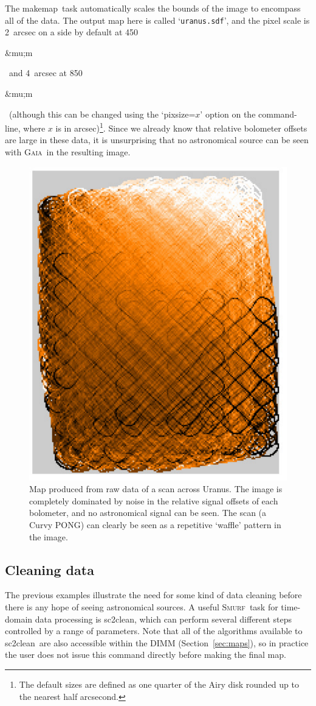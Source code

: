 \documentclass[twoside,11pt]{article}
\newcommand{\micron}{\mbox{\,${\umu}$m}}            %
\newcommand{\xref}[3]{#1}
\newcommand{\xlabel}[1]{}
\renewcommand{\_}{\texttt{\symbol{95}}}
\newcommand{\gaia}{\xref{\textsc{Gaia}}{sun214}{}}
\newcommand{\smurf}{\xref{\textsc{Smurf}}{sun258}{}}
\newcommand{\task}[1]{\textsf{#1}}
\newcommand{\clean}{\xref{\task{sc2clean}}{sun258}{SC2CLEAN}}
\newcommand{\makemap}{\xref{\task{makemap}}{sun258}{MAKEMAP}}
\renewcommand{\micron}{\begin{rawhtml}&mu;m\end{rawhtml}}
\begin{document}
The \makemap\ task automatically scales the bounds of the image to
encompass all of the data. The output map here is called
`\texttt{uranus.sdf}', and the pixel scale is 2~arcsec on a side by
default at 450\micron\ and 4~arcsec at 850\micron\ (although this can
be changed using the `pixsize=$x$' option on the command-line, where
$x$ is in arcsec)\footnote{The default sizes are defined as one
  quarter of the Airy disk rounded up to the nearest half
  arcsecond.}. Since we already know that relative bolometer offsets
are large in these data, it is unsurprising that no astronomical
source can be seen with \gaia\ in the resulting image.

\begin{figure}
\begin{center}
\includegraphics[width=0.5\linewidth]{sc19_rawmap}
\caption{Map produced from raw data of a scan across Uranus. The
  image is completely dominated by noise in the relative signal
  offsets of each bolometer, and no astronomical signal can be
  seen. The scan (a Curvy PONG) can clearly be seen as a repetitive
  `waffle' pattern in the image.}
\label{fig:rawmap}
\end{center}
\end{figure}

\subsection{\xlabel{clean}Cleaning data}

The previous examples illustrate the need for some kind of data
cleaning before there is any hope of seeing astronomical sources. A
useful \smurf\ task for time-domain data processing is \clean, which
can perform several different steps controlled by a range of
parameters. Note that all of the algorithms available to \clean\ are
also accessible within the DIMM (Section~\ref{sec:maps}), so in
practice the user does not issue this command directly before making
the final map.
\end{document}
